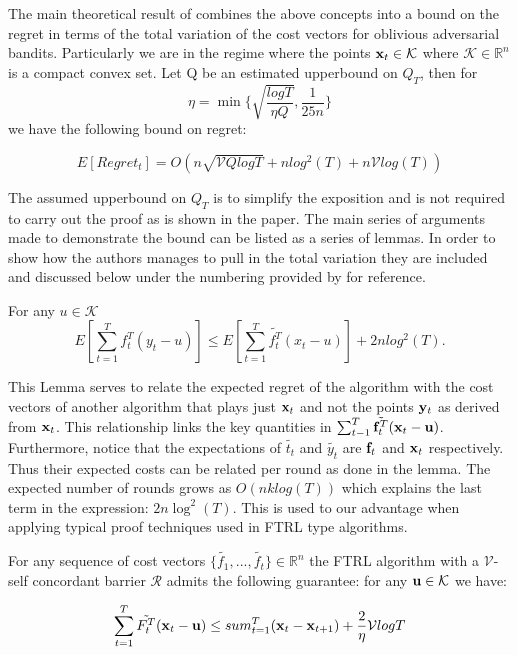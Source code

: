 The main theoretical result of \citep{hazan} combines the above concepts into a bound on the regret in terms of the total variation of the cost vectors for oblivious adversarial bandits. Particularly we are in the regime where the points ${\bf x}_t \in \mathcal{K}$ where $\mathcal{K} \in \mathbb{R}^n$ is a compact 
convex set. Let Q be an estimated upperbound on $Q_T$, then for $$\eta = \min\{\sqrt{\frac{log T}{\eta Q}}, \frac{1}{25n}\}$$ we have the following bound on regret:

\begin{equation}
  E[Regret_t] = O(n \sqrt{\mathcal{V}Q log T} + n log^2(T) + n \mathcal{V}log(T))
\end{equation}

The assumed upperbound on $Q_T$ is to simplify the exposition and is not required to carry out the proof as is shown in the paper. The main series of arguments made to demonstrate the bound can be listed as a series of lemmas. In order to show how the authors manages to pull in the total variation they are included and discussed below under the numbering provided by \citep{hazan} for reference.

\begin{clemma}{7}
	For any $u \in \mathcal{K}$
	\begin{equation}
  		E[\sum_{t=1}^T f_{t}^T(y_t - u)] \leq E[\sum_{t=1}^T \tilde{f_{t}^T}(x_t - u)] + 2nlog^2(T).
	\end{equation}
\end{clemma}

This Lemma serves to relate the expected regret of the algorithm with the cost vectors of another algorithm that plays just ${\bf x}_t$ and not the points ${\bf y}_t$ as derived from ${\bf x}_t$. This relationship links the key quantities in $\sum_{t-1}^T \tilde{{\bf f}_t^T}({\bf x}_t - {\bf u})$. Furthermore, notice that the expectations of $\tilde{t_t}$ and $\tilde{y_t}$ are ${\bf f}_t$ and ${\bf x}_t$ respectively. Thus their expected costs can be related per round as done in the lemma. The expected number of rounds grows as $O(nklog(T))$ which explains the last term in the expression: $2n\log^2(T)$. This is used to our advantage when applying typical proof techniques used in FTRL type algorithms.

\begin{clemma}{8}
	For any sequence of cost vectors $\{\tilde{f_1}, ...,\tilde{f_t}\} \in \mathbb{R}^n$ the FTRL algorithm with a $\mathcal{V}$-self concordant barrier $\mathcal{R}$ admits the following
	guarantee: for any ${\bf u} \in \mathcal{K}$ we have:

	\begin{equation}
  		\sum_{t=1}^T \tilde{F_{t}^T} ({\bf x}_t - {\bf u}) \leq sum_{t=1}^T ({\bf x}_t - {\bf x}_{t+1}) + \frac{2}{\eta}\mathcal{V} log T
	\end{equation}
\end{clemma}

